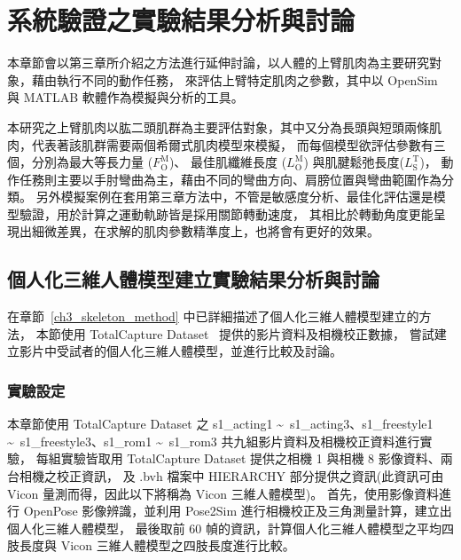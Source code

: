 \chapter{系統驗證之實驗結果分析與討論}
\fontsize{12pt}{18pt}\selectfont %

本章節會以第三章所介紹之方法進行延伸討論，以人體的上臂肌肉為主要研究對象，藉由執行不同的動作任務，
來評估上臂特定肌肉之參數，其中以 OpenSim 與 MATLAB 軟體作為模擬與分析的工具。

本研究之上臂肌肉以肱二頭肌群為主要評估對象，其中又分為長頭與短頭兩條肌肉，代表著該肌群需要兩個希爾式肌肉模型來模擬，
而每個模型欲評估參數有三個，分別為最大等長力量 ($F^\mathrm{M}_\mathrm{O}$)、
最佳肌纖維長度 ($L^\mathrm{M}_\mathrm{O}$) 與肌腱鬆弛長度($L^\mathrm{T}_\mathrm{S}$)，
動作任務則主要以手肘彎曲為主，藉由不同的彎曲方向、肩膀位置與彎曲範圍作為分類。
另外模擬案例在套用第三章方法中，不管是敏感度分析、最佳化評估還是模型驗證，用於計算之運動軌跡皆是採用關節轉動速度，
其相比於轉動角度更能呈現出細微差異，在求解的肌肉參數精準度上，也將會有更好的效果。

\section{個人化三維人體模型建立實驗結果分析與討論}\label{ch4_skeleton_exp}
在章節~\ref{ch3_skeleton_method} 中已詳細描述了個人化三維人體模型建立的方法，
本節使用 TotalCapture Dataset~\cite{Trumble:BMVC:2017} 提供的影片資料及相機校正數據，
嘗試建立影片中受試者的個人化三維人體模型，並進行比較及討論。

\subsection{實驗設定}
本章節使用 TotalCapture Dataset 之 
s1\_acting1 \textasciitilde\ s1\_acting3、s1\_freestyle1 \textasciitilde\ s1\_freestyle3、s1\_rom1 \textasciitilde\ s1\_rom3 
共九組影片資料及相機校正資料進行實驗，
每組實驗皆取用 TotalCapture Dataset 提供之相機 1 與相機 8 影像資料、兩台相機之校正資訊，
及 .bvh 檔案中 HIERARCHY 部分提供之資訊(此資訊可由 Vicon 量測而得，因此以下將稱為 Vicon 三維人體模型)。
首先，使用影像資料進行 OpenPose 影像辨識，並利用 Pose2Sim 進行相機校正及三角測量計算，建立出個人化三維人體模型，
最後取前 60 幀的資訊，計算個人化三維人體模型之平均四肢長度與 Vicon 三維人體模型之四肢長度進行比較。

